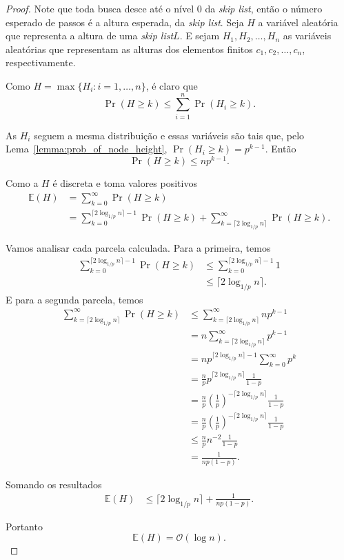 \documentclass[paper=a4, fontsize=11pt]{scrartcl} %
\numberwithin{equation}{section}
\numberwithin{figure}{section}
\numberwithin{table}{section}
\numberwithin{definition}{section}
\numberwithin{theorem}{section}
\numberwithin{property}{section}
\numberwithin{proposition}{section}
\newcommand{\cO}{\ensuremath{\mathcal{O}}}
\newcommand{\skl}{\textit{skip list}\xspace}
\newcommand{\Exp}{\ensuremath{{\mathbb{E}}}\xspace}
\begin{document}
\begin{proof}

Note que toda busca desce até o nível 0 da \skl, então o número esperado de passos é a altura esperada, da \skl. Seja $H$ a variável aleatória que representa a altura de uma \skl $L$. E sejam 
$H_1, H_2, \ldots, H_n$ as variáveis aleatórias que representam as alturas dos elementos finitos
$c_1, c_2, \ldots, c_n$, respectivamente.

Como $H = \max \{H_i : i = 1, \ldots, n \}$, é claro que
$$
\Pr(H \geq k) \leq \sum_{i=1}^n \Pr(H_i \geq k).
$$

As $H_i$ seguem a mesma distribuição e essas variáveis são tais que, pelo Lema~\ref{lemma:prob_of_node_height},  
 $ \Pr(H_i \geq k) = p^{k - 1}$. Então
$$
\Pr(H \geq k) \leq np^{k - 1}.
$$

Como a $H$ é discreta e toma valores positivos
\begin{align*}
\Exp(H) &= \sum_{k = 0}^{\infty} \Pr(H \geq k)  \\
        &= \sum_{k = 0}^{\lceil 2 \log_{1/p} n \rceil - 1} \Pr(H \geq k) +
        \sum_{k = \lceil 2 \log_{1/p} n \rceil}^{\infty} \Pr(H \geq k).
\end{align*}

Vamos analisar cada parcela calculada. Para a primeira, temos
\begin{align*}
\sum_{k = 0}^{\lceil 2 \log_{1/p} n \rceil - 1} \Pr(H \geq k) &\leq 
  \sum_{k = 0}^{\lceil 2 \log_{1/p} n \rceil - 1} 1 \\
&\leq \lceil 2 \log_{1/p} n \rceil.
\end{align*}
E para a segunda parcela, temos
\begin{align*}
\sum_{k = \lceil 2 \log_{1/p} n \rceil}^{\infty} \Pr(H \geq k) 
   &\leq \sum_{k = \lceil 2 \log_{1/p} n \rceil}^{\infty} np^{k - 1} \\
   &= n \sum_{k = \lceil 2 \log_{1/p} n \rceil}^{\infty} p^{k - 1} \\
   &= n p^{\lceil 2 \log_{1/p} n \rceil - 1} \sum_{k = 0}^{\infty} p^k \\
   &= \frac{n}{p} p^{\lceil 2 \log_{1/p} n \rceil} \frac{1}{1 - p} \\
   &= \frac{n}{p} \left( \frac{1}{p} \right)^{- \lceil 2 \log_{1/p} n \rceil} \frac{1}{1 - p} \\
   &= \frac{n}{p} \left( \frac{1}{p} \right)^{- \lceil 2 \log_{1/p} n \rceil} \frac{1}{1 - p} \\
   &\leq \frac{n}{p} n^{-2} \frac{1}{1 - p} \\
   &= \frac{1}{np(1 - p)}.
\end{align*}

Somando os resultados
\begin{align*}
\Exp(H) &\leq \lceil 2 \log_{1/p} n \rceil + \frac{1}{np(1 - p)}.
\end{align*}

Portanto
$$
\Exp(H) = \cO(\log n).
$$
\end{proof}
\end{document}
